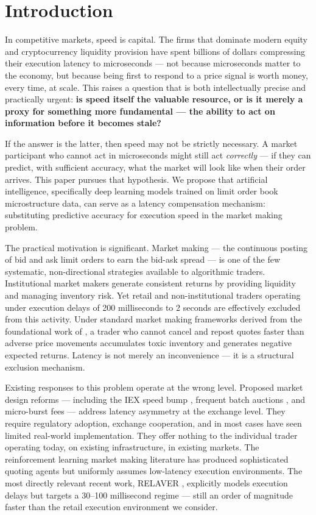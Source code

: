 \documentclass[12pt]{article}
\begin{document}
\section{Introduction}

In competitive markets, speed is capital. The firms that dominate modern equity and cryptocurrency liquidity provision have spent billions of dollars compressing their execution latency to microseconds --- not because microseconds matter to the economy, but because being first to respond to a price signal is worth money, every time, at scale. This raises a question that is both intellectually precise and practically urgent: \textbf{is speed itself the valuable resource, or is it merely a proxy for something more fundamental --- the ability to act on information before it becomes stale?}

If the answer is the latter, then speed may not be strictly necessary. A market participant who cannot act in microseconds might still act \emph{correctly} --- if they can predict, with sufficient accuracy, what the market will look like when their order arrives. This paper pursues that hypothesis. We propose that artificial intelligence, specifically deep learning models trained on limit order book microstructure data, can serve as a latency compensation mechanism: substituting predictive accuracy for execution speed in the market making problem.

The practical motivation is significant. Market making --- the continuous posting of bid and ask limit orders to earn the bid-ask spread --- is one of the few systematic, non-directional strategies available to algorithmic traders. Institutional market makers generate consistent returns by providing liquidity and managing inventory risk. Yet retail and non-institutional traders operating under execution delays of 200 milliseconds to 2 seconds are effectively excluded from this activity. Under standard market making frameworks derived from the foundational work of \citet{avellaneda2008}, a trader who cannot cancel and repost quotes faster than adverse price movements accumulates toxic inventory and generates negative expected returns. Latency is not merely an inconvenience --- it is a structural exclusion mechanism.

Existing responses to this problem operate at the wrong level. Proposed market design reforms --- including the IEX speed bump \citep{hu2019}, frequent batch auctions \citep{budish2015}, and micro-burst fees \citep{brolley2023} --- address latency asymmetry at the exchange level. They require regulatory adoption, exchange cooperation, and in most cases have seen limited real-world implementation. They offer nothing to the individual trader operating today, on existing infrastructure, in existing markets. The reinforcement learning market making literature \citep{spooner2018,guo2023} has produced sophisticated quoting agents but uniformly assumes low-latency execution environments. The most directly relevant recent work, RELAVER \citep{jiang2025}, explicitly models execution delays but targets a 30--100 millisecond regime --- still an order of magnitude faster than the retail execution environment we consider.
\end{document}
